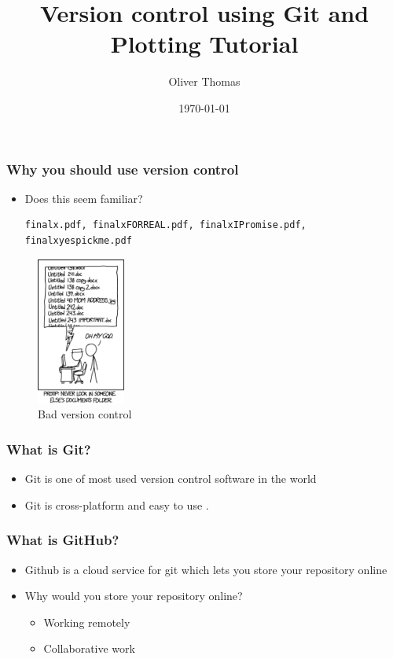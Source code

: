 \documentclass{beamer}
\title{Version control using Git and Plotting Tutorial}
\author{Oliver Thomas}
\institute{Quantum Engineering CDT \\ University of Bristol}
\date{\today}
\begin{document}
\frame{\titlepage}

\begin{frame}
\frametitle{Why you should use version control}
\begin{itemize}
	\item Does this seem familiar? 
\begin{verbatim}
finalx.pdf, finalxFORREAL.pdf, finalxIPromise.pdf, finalxyespickme.pdf 
\end{verbatim}
\end{itemize}
\begin{figure}[H]
	\centering
	\includegraphics[width=0.26\textwidth]{xkcdversion.png}
	\caption{Bad version control\footnotemark }
	\label{fig:xkcdversion}
\end{figure}
\end{frame}

\begin{frame}
\frametitle{What is Git?}
\begin{itemize}
\item Git is one of most used version control software in the world 
\item Git is cross-platform and easy to use \footnotemark.
\end{itemize}
\end{frame}

\begin{frame}
\frametitle{What is GitHub?}
\begin{itemize} 
\item Github is a cloud service for git which lets you store your repository online
\item Why would you store your repository online?
\begin{itemize}
\item Working remotely
\item Collaborative work  
\end{itemize}
\end{itemize}
\end{frame}
\end{document}
